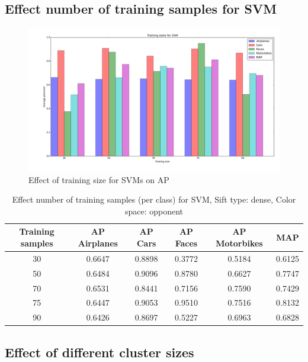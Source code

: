 \subsection{Effect number of training samples for SVM}
\begin{figure}[H]
\includegraphics[scale=0.40]{plots/training_size_SVM}
\caption{Effect of training size for SVMs on AP}
\end{figure}

\begin{table}[H]
\begin{tabular}{|c|ccccc|}
\hline
\textbf{Training samples} & \textbf{AP Airplanes} & \textbf{AP Cars} & \textbf{AP Faces} & \textbf{AP Motorbikes} & \textbf{MAP}\\
\hline
30 & 0.6647 & 0.8898 & 0.3772 & 0.5184& 0.6125\\
50 & 0.6484 & 0.9096 & 0.8780 & 0.6627 & 0.7747\\
70 & 0.6531 & 0.8441 & 0.7156 & 0.7590 & 0.7429\\
75 & 0.6447 & 0.9053 & 0.9510 & 0.7516 & 0.8132\\
90 & 0.6426 & 0.8697 & 0.5227 & 0.6963 & 0.6828\\
\hline
\end{tabular}
\caption{Effect number of training samples (per class) for SVM, Sift type: dense, Color space: opponent}
\end{table}


\subsection{Effect of different cluster sizes}

